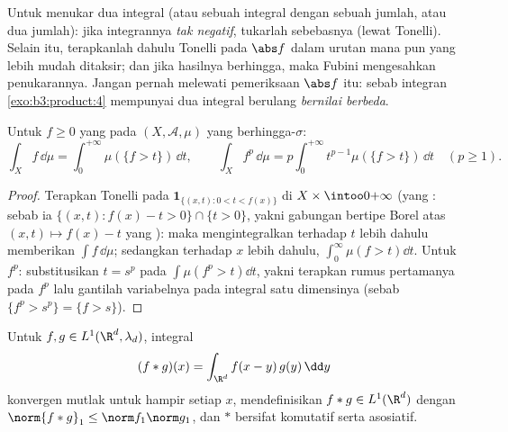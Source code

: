 \begin{method}\label{met:b3:product:fubini}
Untuk menukar dua integral (atau sebuah integral dengan sebuah jumlah, atau dua
jumlah): jika integrannya \emph{tak negatif}, tukarlah
sebebasnya (lewat Tonelli). Selain itu, terapkanlah dahulu Tonelli pada $\abs f$
dalam urutan mana pun yang lebih mudah ditaksir; dan jika hasilnya
berhingga, maka Fubini mengesahkan penukarannya. Jangan pernah melewati
pemeriksaan $\abs f$ itu: sebab integran \cref{exo:b3:product:4} mempunyai dua
integral berulang \emph{bernilai berbeda}.
\end{method}

\begin{proposition}\label{prop:b3:product:layercake}
Untuk $f \geq 0$ yang  pada $(X, \mathcal A, \mu)$ yang
berhingga-$\sigma$:
\[
\int_X f\,\dd\mu = \int_0^{+\infty}\mu(\{f > t\})\,\dd t,
\qquad
\int_X f^p\,\dd\mu = p\int_0^{+\infty}t^{p-1}\mu(\{f >
t\})\,\dd t \quad (p \geq 1).
\]
\end{proposition}

\begin{proof}
Terapkan Tonelli pada $\mathbf 1_{\{(x,t) : 0 < t < f(x)\}}$ di $X
\times \intoo0{+\infty}$ (yang : sebab ia $\{(x,t): f(x) - t
> 0\}\cap\{t > 0\}$, yakni gabungan bertipe Borel atas
$(x,t)\mapsto f(x) - t$ yang ): maka mengintegralkan terhadap $t$ lebih dahulu
memberikan $\int f\,\dd\mu$; sedangkan terhadap $x$ lebih dahulu, $\int_0^\infty\mu(f >
t)\dd t$. Untuk $f^p$: substitusikan $t = s^p$ pada $\int\mu(f^p > t)
\dd t$, yakni terapkan rumus pertamanya pada $f^p$ lalu gantilah
variabelnya pada integral satu dimensinya (sebab $\{f^p > s^p\} =
\{f > s\}$).
\end{proof}

\begin{theorem}\label{thm:b3:product:convolution}
Untuk $f, g \in L^1(\R^d, \lambda_d)$, integral
\[
(f * g)(x) = \int_{\R^d} f(x - y)\,g(y)\,\dd y
\]
konvergen mutlak untuk hampir setiap $x$, mendefinisikan $f * g \in
L^1(\R^d)$ dengan $\norm{f*g}_1 \leq \norm f_1\norm g_1$, dan
$*$ bersifat komutatif serta asosiatif.
\end{theorem}

